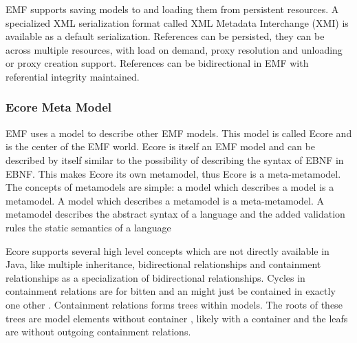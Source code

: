 EMF supports saving models to and loading them from persistent resources. A specialized XML serialization format called XML Metadata Interchange (XMI) is available as a default serialization. References can be persisted, they can be across multiple resources, with load on demand, proxy resolution and unloading or proxy creation support. References can be bidirectional in EMF with referential integrity maintained. \cite{EMF2nd}\\

\subsubsection{Ecore Meta Model} \label{ecore}
EMF uses a model to describe other EMF models. This model is called Ecore and is the center of the EMF world. Ecore is itself an EMF model and can be described by itself similar to the possibility of describing the syntax of EBNF in EBNF. This makes Ecore its own metamodel, thus Ecore is a meta-metamodel. The concepts of metamodels are simple: a model which describes a model is a metamodel. A model which describes a metamodel is a meta-metamodel. \cite{EMF2nd}  A metamodel describes the abstract syntax of a language \cite{EMP} and the added validation rules the static semantics of a language \cite{MDSD}

Ecore supports several high level concepts which are not directly available in Java, like multiple inheritance, bidirectional relationships and containment relationships as a specialization of bidirectional relationships. Cycles in containment relations are for bitten and an  might just be contained in exactly one other . Containment relations forms trees within models. The roots of these trees are model elements without container , likely with a container  and the leafs are  without outgoing containment relations. 

